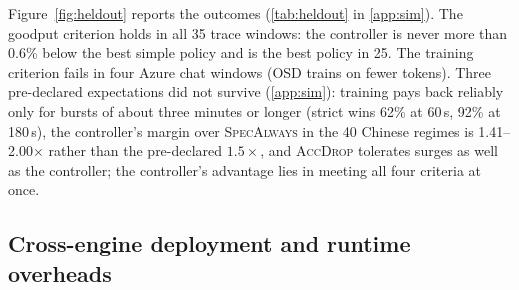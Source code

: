 \documentclass{article}
\newcommand{\pol}[1]{\textsc{#1}}
\begin{document}
Figure~\ref{fig:heldout} reports the outcomes (\cref{tab:heldout} in \cref{app:sim}). The goodput criterion holds in all 35 trace windows: the controller is never more than 0.6\% below the best simple policy and is the best policy in 25. The training criterion fails in four Azure chat windows (\pol{OSD} trains on fewer tokens). Three pre-declared expectations did not survive (\cref{app:sim}): training pays back reliably only for bursts of about three minutes or longer (strict wins 62\% at 60\,s, 92\% at 180\,s), the controller's margin over \pol{SpecAlways} in the 40 Chinese regimes is 1.41--2.00$\times$ rather than the pre-declared $1.5\times$, and \pol{AccDrop} tolerates surges as well as the controller; the controller's advantage lies in meeting all four criteria at once.

\subsection{Cross-engine deployment and runtime overheads}\label{sec:sglang}
\end{document}
